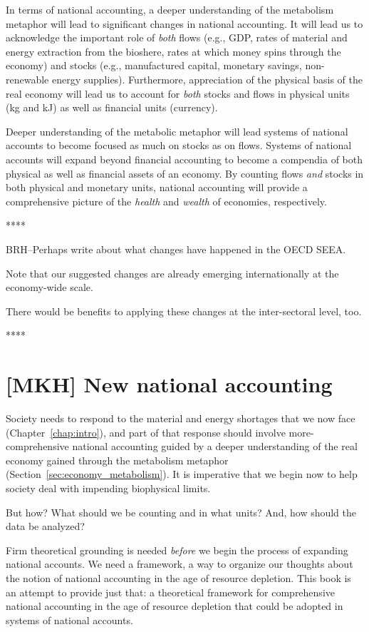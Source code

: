 In terms of national accounting, 
a deeper understanding of the metabolism metaphor 
will lead to significant changes in national accounting.
It will lead us to acknowledge
the important role of \emph{both} flows 
(e.g., GDP, 
rates of material and energy extraction from the bioshere,
rates at which money spins through the economy)
and stocks 
(e.g., manufactured capital, monetary savings, non-renewable energy supplies).
Furthermore, appreciation of the physical basis of the real economy will lead us 
to account for \emph{both} stocks and flows 
in physical units (kg and kJ) as well as financial units (currency).

Deeper understanding of the metabolic metaphor will
lead systems of national accounts to become
focused as much on stocks as on flows.
Systems of national accounts will expand beyond financial accounting
to become a compendia of both physical as well as financial assets
of an economy.
By counting flows \emph{and} stocks 
in both physical and monetary units,
national accounting will provide a comprehensive picture 
of the \emph{health} and \emph{wealth} of economies, respectively.

**** 

BRH--Perhaps write about what changes have happened in the OECD SEEA.

Note that our suggested changes are already 
emerging internationally at the economy-wide scale.

There would be benefits to applying these changes at the inter-sectoral level, too.

****


\section{[MKH] New national accounting}
\label{sec:new_national_accounting}

Society needs to respond 
to the material and energy shortages that
we now face (Chapter~\ref{chap:intro}),
and part of that response
should involve more-comprehensive national accounting 
guided by a deeper understanding of the real economy 
gained through the metabolism metaphor (Section~\ref{sec:economy_metabolism}).
It is imperative that we begin now
to help society deal with impending biophysical limits.

But how? 
What should we be counting and in what units?
And, how should the data be analyzed?

Firm theoretical grounding is needed 
\emph{before} we begin the process of expanding national accounts.
We need a framework, a way to organize our thoughts about the notion 
of national accounting in the age of resource depletion.
This book is an attempt to provide just that: 
a theoretical framework
for comprehensive national accounting
in the age of resource depletion
that could be adopted in systems of national accounts.

